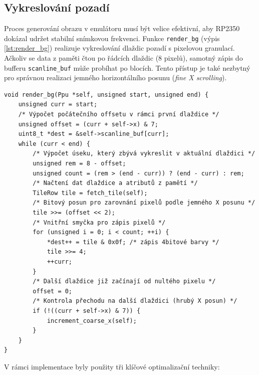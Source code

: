 \subsection{Vykreslování pozadí}

Proces generování obrazu v emulátoru musí být velice efektivní, aby RP2350 dokázal udržet stabilní
snímkovou frekvenci. Funkce \texttt{render\_bg} (výpis \ref{lst:render_bg}) realizuje vykreslování
dlaždic pozadí s pixelovou granulací. Ačkoliv se data z paměti čtou po řádcích dlaždic (8 pixelů),
samotný zápis do bufferu \texttt{scanline\_buf} může probíhat po blocích. Tento přístup je také
nezbytný pro správnou realizaci jemného horizontálního posunu (\textit{fine X scrolling}).

\begin{listing}[htbp]
\begin{verbatim}
void render_bg(Ppu *self, unsigned start, unsigned end) {
    unsigned curr = start;
    /* Výpočet počátečního offsetu v rámci první dlaždice */
    unsigned offset = (curr + self->x) & 7;
    uint8_t *dest = &self->scanline_buf[curr];
    while (curr < end) {
        /* Výpočet úseku, který zbývá vykreslit v aktuální dlaždici */
        unsigned rem = 8 - offset;
        unsigned count = (rem > (end - curr)) ? (end - curr) : rem;
        /* Načtení dat dlaždice a atributů z pamětí */
        TileRow tile = fetch_tile(self);
        /* Bitový posun pro zarovnání pixelů podle jemného X posunu */
        tile >>= (offset << 2);
        /* Vnitřní smyčka pro zápis pixelů */
        for (unsigned i = 0; i < count; ++i) {
            *dest++ = tile & 0x0f; /* zápis 4bitové barvy */
            tile >>= 4;
            ++curr;
        }
        /* Další dlaždice již začínají od nultého pixelu */
        offset = 0;
        /* Kontrola přechodu na další dlaždici (hrubý X posun) */
        if (!((curr + self->x) & 7)) {
            increment_coarse_x(self);
        }
    }
}
\end{verbatim}
\caption{Funkce pro vykreslování dlaždicových řádku pozadí.}
\label{lst:render_bg}
\end{listing}

V rámci implementace byly použity tři klíčové optimalizační techniky:

